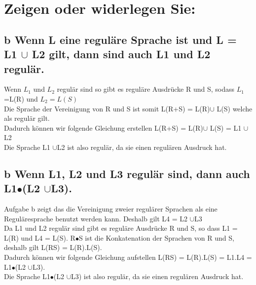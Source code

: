 \documentclass[11pt]{article} %
\begin{document}
\section{Zeigen oder widerlegen Sie:}
\subsection{b Wenn L eine reguläre Sprache ist und L = L1 $\cup$ L2 gilt, dann sind auch L1 und L2 regulär.}
Wenn $L_{1}$ und $L_{2}$ regulär sind so gibt es reguläre Ausdrücke R und  S, sodass  $L_{1}$=L(R) und  $L_{2}=L(S)$\\
Die Sprache der Vereinigung von R und S ist somit  L(R+S) = L(R)$\cup$ L(S) welche als regulär gilt.\\
Dadurch können wir folgende Gleichung erstellen L(R+S) = L(R)$\cup$ L(S) =  L1 $\cup$ L2\\
Die Sprache L1 $\cup$L2 ist  also regulär, da sie einen regulären Ausdruck hat.
\subsection{b Wenn L1, L2 und L3 regulär sind, dann auch L1$\bullet$(L2 $\cup$L3).}
Aufgabe b zeigt das die Vereinigung zweier regulärer Sprachen als eine Reguläresprache benutzt werden kann. Deshalb gilt L4 = L2 $\cup$L3\\
Da L1 und L2 regulär sind gibt es reguläre Ausdrücke R und S, so dass L1 = L(R) und L4 = L(S).  R$\bullet$S ist die Konkatenation der Sprachen
von R und S, deshalb gilt L(RS) = L(R).L(S).\\
Dadurch können wir folgende Gleichung aufstellen L(RS) = L(R).L(S) = L1.L4 =  L1$\bullet$(L2 $\cup$L3).\\
Die Sprache L1$\bullet$(L2 $\cup$L3) ist  also regulär, da sie einen regulären Ausdruck hat.
\end{document}
